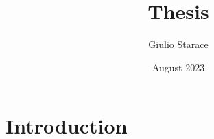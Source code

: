 \documentclass{article}
\title{Thesis}
\author{Giulio Starace}
\date{August 2023}
\begin{document}
\maketitle

\section{Introduction}
\end{document}
